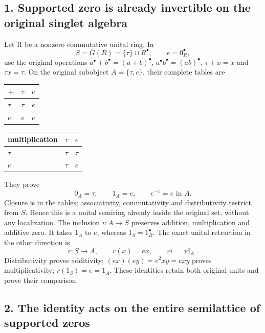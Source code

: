 \documentclass[
  10pt,
  a4paper,
]{article}
\newcounter{none} %
\begin{document}
\subsection{1. Supported zero is already invertible on the original
singlet
algebra}\label{supported-zero-is-already-invertible-on-the-original-singlet-algebra}

Let R be a nonzero commutative unital ring. In \[
S=G(R)=\{\tau\}\sqcup R^\bullet,\qquad e=0_R^\bullet,
\tag{ZH1}
\] use the original operations \(a^\bullet+b^\bullet=(a+b)^\bullet\),
\(a^\bullet b^\bullet=(ab)^\bullet\), \(\tau+x=x\) and \(\tau x=\tau\).
On the original subobject \(A=\{\tau,e\}\), their complete tables are

{\def\LTcaptype{none} %
\begin{longtable}[]{@{}lll@{}}
\toprule\noalign{}
+ & \(\tau\) & \(e\) \\
\midrule\noalign{}
\endhead
\bottomrule\noalign{}
\endlastfoot
\(\tau\) & \(\tau\) & \(e\) \\
\(e\) & \(e\) & \(e\) \\
\end{longtable}
}

{\def\LTcaptype{none} %
\begin{longtable}[]{@{}lll@{}}
\toprule\noalign{}
multiplication & \(\tau\) & \(e\) \\
\midrule\noalign{}
\endhead
\bottomrule\noalign{}
\endlastfoot
\(\tau\) & \(\tau\) & \(\tau\) \\
\(e\) & \(\tau\) & \(e\) \\
\end{longtable}
}

They prove \[
0_A=\tau,\qquad 1_A=e,\qquad e^{-1}=e\text{ in }A.
\tag{ZH2}
\] Closure is in the tables; associativity, commutativity and
distributivity restrict from \(S\). Hence this is a unital semiring
already inside the original set, without any localization. The inclusion
\(i:A\to S\) preserves addition, multiplication and additive zero. It
takes \(1_A\) to \(e\), whereas \(1_S=1_R^\bullet\). The exact unital
retraction in the other direction is \[
r:S\to A,\qquad r(x)=ex,\qquad ri=\operatorname{id}_A.
\tag{ZH3}
\] Distributivity proves additivity; \((ex)(ey)=e^2xy=exy\) proves
multiplicativity; \(r(1_S)=e=1_A\). These identities retain both
original units and prove their comparison.

\subsection{2. The identity acts on the entire semilattice of supported
zeros}\label{the-identity-acts-on-the-entire-semilattice-of-supported-zeros}
\end{document}

